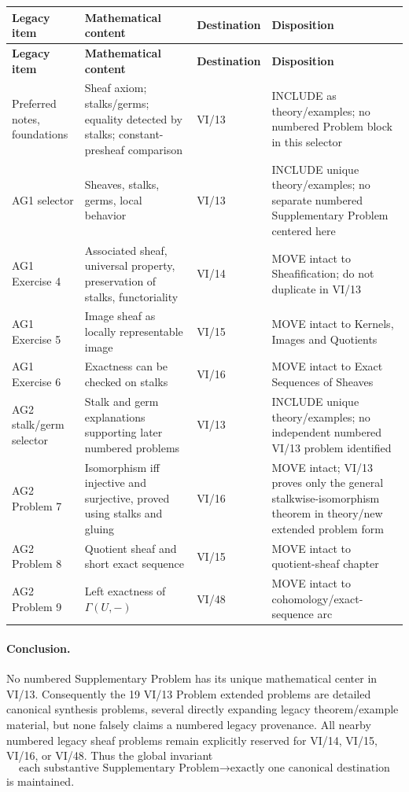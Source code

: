 \begin{center}
\small
\begin{longtable}{>{\raggedright\arraybackslash}p{}
>{\raggedright\arraybackslash}p{}
>{\raggedright\arraybackslash}p{}
>{\raggedright\arraybackslash}p{}}
\toprule
\textbf{Legacy item} & \textbf{Mathematical content} & \textbf{Destination} & \textbf{Disposition}\\
\midrule
\endfirsthead
\toprule
\textbf{Legacy item} & \textbf{Mathematical content} & \textbf{Destination} & \textbf{Disposition}\\
\midrule
\endhead
Preferred notes, foundations & Sheaf axiom; stalks/germs; equality detected by stalks; constant-presheaf comparison & VI/13 & INCLUDE as theory/examples; no numbered Problem block in this selector\\
AG1 selector & Sheaves, stalks, germs, local behavior & VI/13 & INCLUDE unique theory/examples; no separate numbered Supplementary Problem centered here\\
AG1 Exercise 4 & Associated sheaf, universal property, preservation of stalks, functoriality & VI/14 & MOVE intact to Sheafification; do not duplicate in VI/13\\
AG1 Exercise 5 & Image sheaf as locally representable image & VI/15 & MOVE intact to Kernels, Images and Quotients\\
AG1 Exercise 6 & Exactness can be checked on stalks & VI/16 & MOVE intact to Exact Sequences of Sheaves\\
AG2 stalk/germ selector & Stalk and germ explanations supporting later numbered problems & VI/13 & INCLUDE unique theory/examples; no independent numbered VI/13 problem identified\\
AG2 Problem 7 & Isomorphism iff injective and surjective, proved using stalks and gluing & VI/16 & MOVE intact; VI/13 proves only the general stalkwise-isomorphism theorem in theory/new extended problem form\\
AG2 Problem 8 & Quotient sheaf and short exact sequence & VI/15 & MOVE intact to quotient-sheaf chapter\\
AG2 Problem 9 & Left exactness of $\Gamma(U,-)$ & VI/48 & MOVE intact to cohomology/exact-sequence arc\\
\bottomrule
\end{longtable}
\end{center}

\paragraph{Conclusion.}
No numbered Supplementary Problem has its unique mathematical center in VI/13.  Consequently the
19 VI/13 Problem extended problems are detailed canonical synthesis problems, several directly
expanding legacy theorem/example material, but none falsely claims a numbered legacy
provenance.  All nearby numbered legacy sheaf problems remain explicitly reserved for
VI/14, VI/15, VI/16, or VI/48.  Thus the global invariant
\[
\boxed{\text{each substantive Supplementary Problem}\longrightarrow\text{exactly one canonical destination}}
\]
is maintained.
